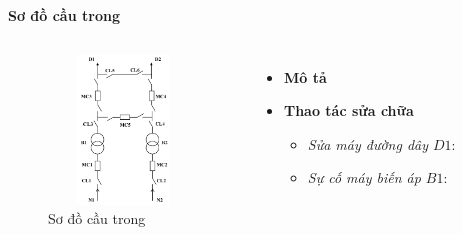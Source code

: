 \documentclass{beamer}
\begin{document}
\begin{frame}{\textbf{Sơ đồ cầu trong}}
\begin{columns}
\begin{figure}[h]
\includegraphics[width=4cm, height=4cm]{sdct}
\caption{Sơ đồ cầu trong}
\end{figure}

\begin{itemize}
\item \textbf{Mô tả}
\item  \textbf{Thao tác sửa chữa}
\begin{itemize}
\item<1-> \emph{Sửa máy đường dây $D1$}: 
\item<1-> \emph{Sự cố máy biến áp $B1$}: 
\end{itemize}
\end{itemize}
\end{columns}
\end{frame}
\end{document}
